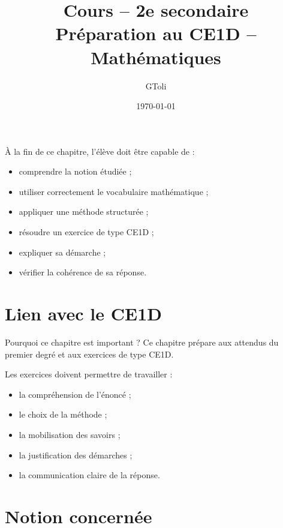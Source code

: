 \documentclass[11pt,a4paper]{article}
\title{\textbf{Cours -- 2e secondaire}\\[0.2cm]
\large Préparation au CE1D -- Mathématiques}
\author{GToli}
\date{\today}
\begin{document}
\maketitle


\begin{cadreobjectif}
À la fin de ce chapitre, l’élève doit être capable de :
\begin{itemize}
    \item comprendre la notion étudiée ;
    \item utiliser correctement le vocabulaire mathématique ;
    \item appliquer une méthode structurée ;
    \item résoudre un exercice de type CE1D ;
    \item expliquer sa démarche ;
    \item vérifier la cohérence de sa réponse.
\end{itemize}
\end{cadreobjectif}

\section{Lien avec le CE1D}

\begin{cadrebleu}{Pourquoi ce chapitre est important ?}
Ce chapitre prépare aux attendus du premier degré et aux exercices de type CE1D.

Les exercices doivent permettre de travailler :
\begin{itemize}
    \item la compréhension de l’énoncé ;
    \item le choix de la méthode ;
    \item la mobilisation des savoirs ;
    \item la justification des démarches ;
    \item la communication claire de la réponse.
\end{itemize}
\end{cadrebleu}

\section{Notion concernée}
\end{document}
